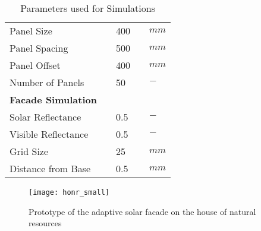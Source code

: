 \begin{table}[h!]
\begin{center}
\begin{tabular}{lllll}
		    Panel Size          		&& 400     		&& $mm$    \\
		    Panel Spacing          		&& 500     		&& $mm$    \\
		    Panel Offset          		&& 400     		&& $mm$    \\
		    Number of Panels          	&& 50     		&& $-$    \\\hline
		    \bf Facade Simulation 		&& ~     		&& ~    \\ \hline
		    Solar Reflectance\footnotemark[3]      									&& 0.5     		&& $-$    \\
		    Visible Reflectance\footnotemark[4]
		    				    		&& 0.5     		&& $-$    \\
		    Grid Size      	    		&& 25     		&& $mm$    \\
		    Distance from Base\footnotemark[4]
		    				     		&& 0.5     		&& $mm$    \\
		    \end{tabular}
		    \end{center}
		    \caption{Parameters used for Simulations}
		\end{table}










		\begin{figure}[h] %
			\begin{center}
			\texttt{[image: honr\_small]}
			\caption{Prototype of the adaptive solar facade on the house of natural resources}
			\label{fig:honr}
			\end{center} 
		\end{figure}
